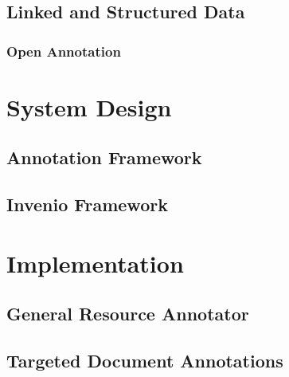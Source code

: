 \documentclass[12pt,a4paper]{report}
\begin{document}
    \clearpage

    \subsection{Linked and Structured Data}
      \label{sec:data}
      

      \subsubsection{Open Annotation}
        \label{sec:oa}
        

  \cleardoublepage

  \section{System Design}
    \label{sec:design}
    

    \subsection{Annotation Framework}
      \label{sec:anno}
      

    \FloatBarrier

    \subsection{Invenio Framework}
      \label{sec:v2}
      

  \cleardoublepage

  \section{Implementation}
    \label{sec:impl}
    

    \subsection{General Resource Annotator}
      \label{sec:gra}
      

    \newpage

    \subsection{Targeted Document Annotations}
      \label{sec:notes}
      
\end{document}
